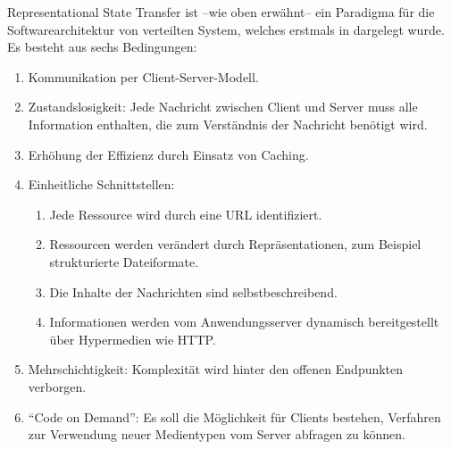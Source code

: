\begin{comment}
Schweregrad, Klinischer Status (gesichert/Verdacht)

Observation Durchgefihrte Messung (zB. Klinisehe Chemie, Fieber, Diagnostik
Puls, Blutdruck), Messergebnis, verwendetes Geri,
Zeitpunkt der Messung, Normbereich

 

Chargtiem erbrache Leising, Unfan, ZipunkVZsivaum, Anahi, | Abrechoung
s, Zu-/Abschkig
‘AuditEvent zion = Duco, ‘Art und Umfang des Zugriffes, | Sicherheit

 

ire-Komponenten bzw. Benutzer
ResearchSubject Nevtnupfong ces die,
Zaire ee etinchos,zugewicocerStudicaaen, ets

Einwilligungen

    

Forschung


\end{comment}

\label{rest-paradigm}

Representational State Transfer ist --wie oben erwähnt-- ein Paradigma für die Softwarearchitektur von verteilten System, welches erstmals in \cite{rest-fielding} dargelegt wurde. Es besteht aus sechs Bedingungen: 

\begin{enumerate}
\item Kommunikation per Client-Server-Modell.
\item Zustandslosigkeit: Jede Nachricht zwischen Client und Server muss alle Information enthalten, die zum Verständnis der Nachricht benötigt wird. 
\item Erhöhung der Effizienz durch Einsatz von Caching.
\item Einheitliche Schnittstellen: 
\begin{enumerate}
\item Jede Ressource wird durch eine URL identifiziert.
\item Ressourcen werden verändert durch Repräsentationen, zum Beispiel strukturierte Dateiformate.
\item Die Inhalte der Nachrichten sind selbstbeschreibend.
\item Informationen werden vom Anwendungsserver dynamisch bereitgestellt über Hypermedien wie HTTP.
\end{enumerate}
\item Mehrschichtigkeit: Komplexität wird hinter den offenen Endpunkten verborgen. 
\item "`Code on Demand"': Es soll die Möglichkeit für Clients bestehen, Verfahren zur Verwendung neuer Medientypen vom Server abfragen zu können.
\end{enumerate}

